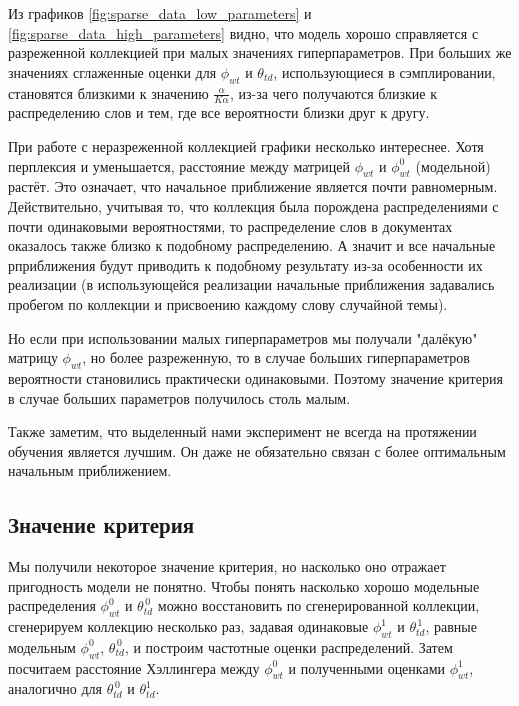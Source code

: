 \documentclass[12pt]{article}
\begin{document}
Из графиков \ref{fig:sparse_data_low_parameters} и \ref{fig:sparse_data_high_parameters} видно, что модель хорошо справляется с разреженной коллекцией при малых значениях гиперпараметров.
При больших же значениях сглаженные оценки для $ \phi_{wt} $ и $ \theta_{td} $, использующиеся в сэмплировании, становятся близкими к значению $ \frac \alpha {K \alpha} $, из-за чего получаются близкие к распределению слов и тем, где все вероятности близки друг к другу.

При работе с неразреженной коллекцией графики несколько интереснее.
Хотя перплексия и уменьшается, расстояние между матрицей $ \phi_{wt} $ и $ \phi_{wt}^0 $ (модельной) растёт.
Это означает, что начальное приближение является почти равномерным.
Действительно, учитывая то, что коллекция была порождена распределениями с почти одинаковыми вероятностями, то распределение слов в документах оказалось также близко к подобному распределению.
А значит и все начальные рприближения будут приводить к подобному результату из-за особенности их реализации (в использующейся реализации начальные приближения задавались пробегом по коллекции и присвоению каждому слову случайной темы).

Но если при использовании малых гиперпараметров мы получали "далёкую" матрицу $ \phi_{wt} $, но более разреженную, то в случае больших гиперпараметров вероятности становились практически одинаковыми.
Поэтому значение критерия в случае больших параметров получилось столь малым.

Также заметим, что выделенный нами эксперимент не всегда на протяжении обучения является лучшим.
Он даже не обязательно связан с более оптимальным начальным приближением.

\subsection{Значение критерия}

Мы получили некоторое значение критерия, но насколько оно отражает пригодность модели не понятно.
Чтобы понять насколько хорошо модельные распределения $ \phi_{wt}^0 $ и $ \theta_{td}^{\,0} $ можно восстановить по сгенерированной коллекции, сгенерируем коллекцию несколько раз, задавая одинаковые $ \phi_{wt}^1 $ и $ \theta_{td}^{\,1} $, равные модельным $ \phi_{wt}^0 $, $ \theta_{td}^{\,0} $, и построим частотные оценки распределений.
Затем посчитаем расстояние Хэллингера между $ \phi_{wt}^0 $ и полученными оценками $ \phi_{wt}^1 $, аналогично для $ \theta_{td}^{\,0} $ и $ \theta_{td}^1 $.
\end{document}
